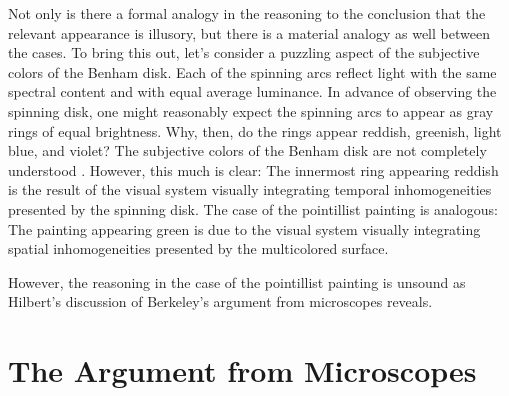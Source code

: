 \documentclass[12pt]{article}
\begin{document}
Not only is there a formal analogy in the reasoning to the conclusion that the relevant appearance is illusory, but there is a material analogy as well between the cases. To bring this out, let's consider a puzzling aspect of the subjective colors of the Benham disk. Each of the spinning arcs reflect light with the same spectral content and with equal average luminance. In advance of observing the spinning disk, one might reasonably expect the spinning arcs to appear as gray rings of equal brightness. Why, then, do the rings appear reddish, greenish, light blue, and violet? The subjective colors of the Benham disk are not completely understood \citep[for a review of some of the color science see][]{Campenhausen:1995yq}. However, this much is clear: The innermost ring appearing reddish is the result of the visual system visually integrating temporal inhomogeneities presented by the spinning disk. The case of the pointillist painting is analogous: The painting appearing green is due to the visual system visually integrating spatial inhomogeneities presented by the multicolored surface. 

However, the reasoning in the case of the pointillist painting is unsound as Hilbert's \citeyear{Hilbert:1987jq} discussion of Berkeley's \citeyear{Berkeley:1734fk} argument from microscopes reveals.


\section{The Argument from Microscopes}\label{sub:the_argument_from_microscopes} %
\end{document}
